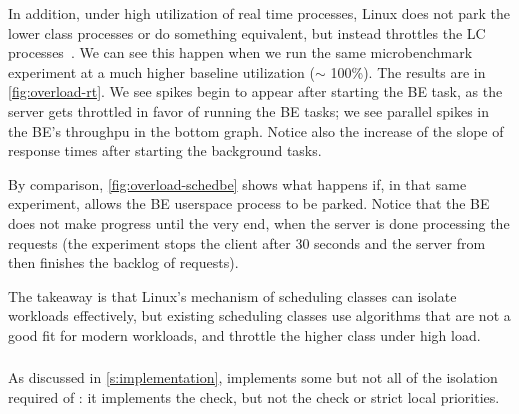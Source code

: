 In addition, under high utilization of real time processes, Linux does not park
the lower class processes or do something equivalent, but instead throttles the
\rtclass{} LC processes~\cite{lkml-deadline-srv}. We can see this happen when
we run the same microbenchmark experiment at a much higher baseline utilization
($\sim$ 100\%). The results are in \autoref{fig:overload-rt}. We see spikes
begin to appear after starting the BE task, as the \rtclass{} server gets
throttled in favor of running the BE tasks; we see parallel spikes in the BE's
throughpu in the bottom graph. Notice also the increase of the slope of response
times after starting the background tasks.

By comparison, \autoref{fig:overload-schedbe} shows what happens if, in that
same experiment, \schedbe{} allows the BE userspace process to be parked. Notice
that the BE does not make progress until the very end, when the server is done
processing the requests (the experiment stops the client after 30 seconds and
the server from then finishes the backlog of requests).

The takeaway is that Linux's mechanism of scheduling classes can isolate
workloads effectively, but existing scheduling classes use algorithms that are
not a good fit for modern workloads, and throttle the higher class under high
load.

\subsubsection{\schedidle}\label{ss:schedidle}

As discussed in \autoref{s:implementation}, \schedidle{} implements some but not
all of the isolation required of \beclass{}: it implements the \entry{} check,
but not the \exit{} check or strict local priorities.

